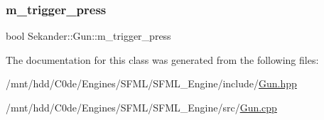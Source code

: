 \mbox{\label{classSekander_1_1Gun_a6e3c2771562a84475c4d596b20388ffa}} 
\subsubsection{\texorpdfstring{m\+\_\+trigger\+\_\+press}{m\_trigger\_press}}
{\footnotesize\ttfamily bool Sekander\+::\+Gun\+::m\+\_\+trigger\+\_\+press\hspace{0.3cm}{\ttfamily [private]}}



The documentation for this class was generated from the following files\+:\begin{DoxyCompactItemize}
\item 
/mnt/hdd/\+C0de/\+Engines/\+S\+F\+M\+L/\+S\+F\+M\+L\+\_\+\+Engine/include/\hyperlink{Gun_8hpp}{Gun.\+hpp}\item 
/mnt/hdd/\+C0de/\+Engines/\+S\+F\+M\+L/\+S\+F\+M\+L\+\_\+\+Engine/src/\hyperlink{Gun_8cpp}{Gun.\+cpp}\end{DoxyCompactItemize}
